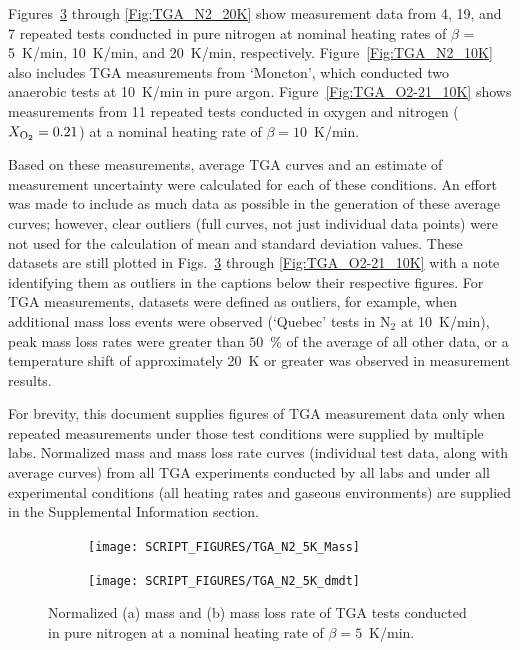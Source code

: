 \documentclass{book}
\begin{document}
Figures~\ref{Fig:TGA_N2_5K} through \ref{Fig:TGA_N2_20K} show measurement data from 4, 19, and 7 repeated tests conducted in pure nitrogen at nominal heating rates of $\beta$ = 5~K/min, 10~K/min, and 20~K/min, respectively. Figure~\ref{Fig:TGA_N2_10K} also includes TGA measurements from ‘Moncton’, which conducted two anaerobic tests at 10~K/min in pure argon. Figure~\ref{Fig:TGA_O2-21_10K} shows measurements from 11 repeated tests conducted in oxygen and nitrogen ($X_{\rm O_2}=0.21$) at a nominal heating rate of $\beta=10$~K/min.

Based on these measurements, average TGA curves and an estimate of measurement uncertainty were calculated for each of these conditions. An effort was made to include as much data as possible in the generation of these average curves; however, clear outliers (full curves, not just individual data points) were not used for the calculation of mean and standard deviation values. These datasets are still plotted in Figs.~\ref{Fig:TGA_N2_5K} through \ref{Fig:TGA_O2-21_10K} with a note identifying them as outliers in the captions below their respective figures. For TGA measurements, datasets were defined as outliers, for example, when additional mass loss events were observed (‘Quebec’ tests in N$_2$ at 10~K/min), peak mass loss rates were greater than $50$~\% of the average of all other data, or a temperature shift of approximately 20~K or greater was observed in measurement results.

For brevity, this document supplies figures of TGA measurement data only when repeated measurements under those test conditions were supplied by multiple labs. Normalized mass and mass loss rate curves (individual test data, along with average curves) from all TGA experiments conducted by all labs and under all experimental conditions (all heating rates and gaseous environments) are supplied in the Supplemental Information section.

\begin{figure} [p]
\centering
\begin{subfigure}[b]{0.85\textwidth}
   \texttt{[image: SCRIPT\_FIGURES/TGA\_N2\_5K\_Mass]}
   \caption{}
   \label{Fig:TGA_N2_5KMass}
\end{subfigure}

\begin{subfigure}[b]{0.85\textwidth}
   \texttt{[image: SCRIPT\_FIGURES/TGA\_N2\_5K\_dmdt]}
   \caption{}
   \label{Fig:TGA_N2_5Kdmdt}
\end{subfigure}

  \caption{Normalized (a) mass and (b) mass loss rate of TGA tests conducted in pure nitrogen at a nominal heating rate of $\beta=5$~K/min.}
  \label{Fig:TGA_N2_5K}
\end{figure}
\end{document}

